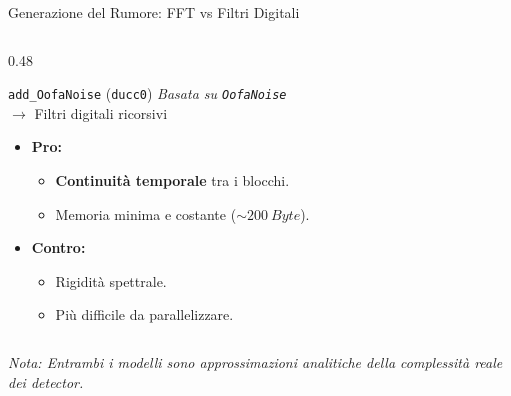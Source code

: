 \documentclass[10pt, aspectratio=169, handout]{beamer}
\begin{document}
\begin{frame}{Generazione del Rumore: FFT vs Filtri Digitali}
\begin{columns}[T]
    \begin{column}{0.48\textwidth}
      \begin{block}{\texttt{add\_OofaNoise} (\texttt{ducc0})}
        \footnotesize
        \textit{Basata su \texttt{OofaNoise}} \\
        $\rightarrow$ Filtri digitali ricorsivi
        \begin{itemize}
          \item \textbf{Pro:} 
            \begin{itemize}
                \item \textbf{Continuità temporale} tra i blocchi.
                \item Memoria minima e costante ($\sim 200 \ Byte$).
            \end{itemize}
          \item \textbf{Contro:} 
            \begin{itemize}
                \item Rigidità spettrale.
                \item Più difficile da parallelizzare.
            \end{itemize}
        \end{itemize}
      \end{block}

      \vspace{0.2cm}
      \centering
    \end{column}

  \end{columns}

  \vfill
  \centering
  \scriptsize\textit{Nota: Entrambi i modelli sono approssimazioni analitiche della complessità reale dei detector.}

\end{frame}
\end{document}
